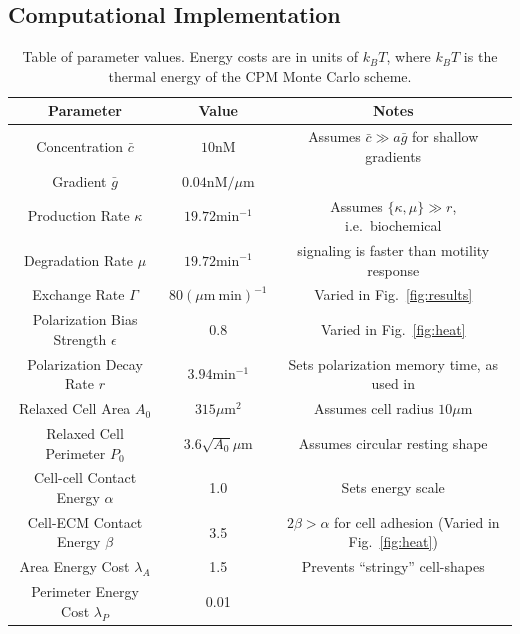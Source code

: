 \subsection{Computational Implementation}


\begin{table}[b]
\centering
\footnotesize
\begin{tabular}{ |c|c|c| }
\hline
Parameter & Value & Notes \\ \hline
Concentration $\bar{c}$ & $10 \text{nM}$ & Assumes $\bar{c} \gg a\bar{g}$ for shallow gradients \cite{malet2015collective,ellison2016cell} \\
Gradient $\bar{g}$ & $0.04 \text{nM/}\mu\text{m}$ & \\ \hline
Production Rate $\kappa$ & $19.72 \text{min}^{-1}$ & Assumes $ \{\kappa,\mu\} \gg r$, i.e.\ biochemical \\
Degradation Rate $\mu$ & $19.72 \text{min}^{-1}$ & signaling is faster than motility response \\ \hline
Exchange Rate $\Gamma$ & $80 (\mu\text{m} \ \text{min})^{-1}$ & Varied in Fig.\ \ref{fig:results} \\ \hline
Polarization Bias Strength $\epsilon$ & 0.8 & Varied in Fig.\ \ref{fig:heat} \\ \hline
Polarization Decay Rate $r$ & $3.94 \text{min}^{-1}$ & Sets polarization memory time, as used in \cite{szabo2010collective} \\ \hline
Relaxed Cell Area $A_0$ & $315 \mu\text{m}^2$ & Assumes cell radius $10 \mu\text{m}$ \cite{leber2009molecular} \\ \hline
Relaxed Cell Perimeter $P_0$ & $3.6\sqrt{A_0} \mu\text{m}$ & Assumes circular resting shape \\ \hline
Cell-cell Contact Energy $\alpha$ & 1.0 & Sets energy scale \\
Cell-ECM Contact Energy $\beta$ & 3.5 & $2\beta > \alpha$ for cell adhesion \cite{graner1992simulation} (Varied in Fig.\ \ref{fig:heat}) \\ \hline
Area Energy Cost $\lambda_A$ & 1.5  & Prevents ``stringy'' cell-shapes \\
Perimeter Energy Cost $\lambda_P$ & 0.01 & \\ \hline
\end{tabular}
\caption{Table of parameter values. Energy costs are in units of $k_B T$, where $k_B T$ is the thermal energy of the CPM Monte Carlo scheme.}
\label{table:ch4_1}
\end{table}


